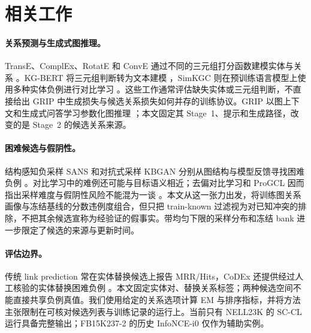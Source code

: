 \section{相关工作}

\paragraph{关系预测与生成式图推理。}
TransE、ComplEx、RotatE 和 ConvE 通过不同的三元组打分函数建模实体与关系 \citep{bordes2013transe,trouillon2016complex,sun2019rotate,dettmers2018conve}。KG-BERT 将三元组判断转为文本建模 \citep{yao2019kgbert}，SimKGC 则在预训练语言模型上使用多种实体负例进行对比学习 \citep{wang2022simkgc}。这些工作通常评估缺失实体或三元组判断，不直接给出 GRIP 中生成损失与候选关系损失如何并存的训练协议。GRIP 以图上下文和生成式问答学习参数化图推理 \citep{feng2025grip}；本文固定其 Stage~1、提示和生成路径，改变的是 Stage~2 的候选关系来源。

\paragraph{困难候选与假阴性。}
结构感知负采样 SANS 和对抗式采样 KBGAN 分别从图结构与模型反馈寻找困难负例 \citep{ahrabian2020sans,cai2018kbgan}。对比学习中的难例还可能与目标语义相近；去偏对比学习和 ProGCL 因而指出采样难度与假阴性风险不能混为一谈 \citep{chuang2020dcl,xia2022progcl}。本文从这一张力出发，将训练图关系画像与冻结基线的分数违例度组合，但只把 train-known 过滤视为对已知冲突的排除，不把其余候选宣称为经验证的假事实。带均匀下限的采样分布和冻结 bank 进一步限定了候选的来源与更新时间。

\paragraph{评估边界。}
传统 link prediction 常在实体替换候选上报告 MRR/Hits，CoDEx 还提供经过人工核验的实体替换困难负例 \citep{safavi2020codex}。本文固定实体对、替换关系标签；两种候选空间不能直接共享负例真值。我们使用给定的关系选项计算 EM 与排序指标，并将方法主张限制在可核对候选列表与训练记录的运行上。当前只有 NELL23K 的 SC-CL 运行具备完整输出；FB15K237-2 的历史 InfoNCE-i0 仅作为辅助实例。
